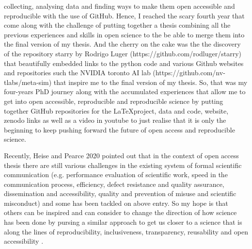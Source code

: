 \documentclass[11pt]{article}
\begin{document}
collecting, analysing data and finding ways to make them open 
accessible and reproducible with the use of GitHub.
Hence, I reached the scary fourth year that come along with the 
challenge of putting together a thesis combining all the previous 
experiences and skills in open science to the be able to 
merge them into the final version of my thesis.
And the cherry on the cake was the 
the discovery of the repository starry 
by Rodrigo Luger (https://github.com/rodluger/starry)
that beautifully embedded links to the python code
and various Github websites and repositories such 
the NVIDIA toronto AI lab (https://github.com/nv-tlabs/meta-sim)
that inspire me to the final version of my thesis.
So, that was my four-years PhD journey along with the 
accumulated experiences that allow me to get into open accessible,
reproducible and reproducible science
by putting together GitHub repositories for the \LaTeX project, 
data and code, website, zenodo links as well as a video in youtube
to just 
realise that it is only the beginning to keep pushing forward 
the future of open access and reproducible science.

Recently, Heise and Pearce 2020 \cite{heise2020} pointed out that 
in the context of open access thesis there 
are still various challenges 
in the existing system of formal scientific communication 
(e.g. performance evaluation of scientific work, speed in the communication process,
efficiency, defect resistance and quality assurance, dissemination and accessibility, 
quality and prevention of misuse and scientific misconduct)
and some has been tackled on above entry. 
So my hope is that others can be inspired and can consider 
to change the direction of how science has been done by  
pursing a similar approach to get us closer to a science that is
along the lines of 
reproducibility, inclusiveness, transparency,
reusability  and open accessibility \cite{xochicale2019-github}.


\printbibliography
\end{document}
